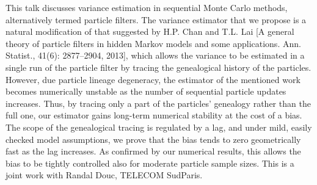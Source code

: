 This talk discusses variance estimation in sequential Monte Carlo
methods, alternatively termed particle filters. The variance estimator
that we propose is a natural modification of that suggested by H.P.
Chan and T.L. Lai [A general theory of particle filters in hidden
Markov models and some applications. Ann. Statist., 41(6):
2877--2904, 2013], which allows the variance to be estimated in a
single run of the particle filter by tracing the genealogical history of
the particles. However, due particle lineage degeneracy, the estimator
of the mentioned work becomes numerically unstable as the number
of sequential particle updates increases. Thus, by tracing only a part
of the particles' genealogy rather than the full one, our estimator
gains long-term numerical stability at the cost of a bias. The scope of
the genealogical tracing is regulated by a lag, and under mild, easily
checked model assumptions, we prove that the bias tends to zero
geometrically fast as the lag increases. As confirmed by our
numerical results, this allows the bias to be tightly controlled also for
moderate particle sample sizes.
This is a joint work with Randal Douc, TELECOM SudParis.